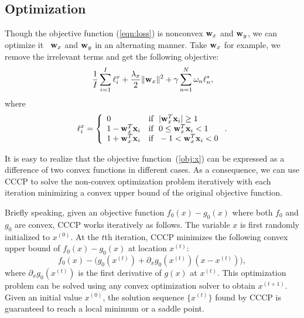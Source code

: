 \subsection{Optimization}

Though the objective function (\ref{eqn:loss}) is nonconvex \wrt ${\bf w}_{x}$ and ${\bf w}_{y}$, we can optimize it \wrt~${\bf w}_{x}$ and ${\bf w}_{y}$ in an alternating manner. Take ${\bf w}_{x}$ for example, we remove the irrelevant terms and get the following objective:
\begin{align}
\frac{1}{I}\sum\limits_{i=1}^{I}\ell_{i}^ {x}+\frac{\lambda_{x}}{2}\|{\bf w}_{x}\|^{2}+\gamma\sum\limits_{n=1}^{N}\omega_{n}\ell_{n}^{*},
\label{obj:x}
\end{align}
where
\begin{align}
\ell_{i}^{x}=\left\{ \begin{array}{ll}
         0 & \mbox{if ~}|\w_{x}^{T}\x_{i}| \ge 1 \\
         1- \w_{x}^{T}\x_{i} & \mbox{if ~}0\le\w_{x}^{T}\x_{i} < 1 \\
         1+\w_{x}^{T}\x_{i} & \mbox{if ~} -1 <\w_{x}^{T}\x_{i}<0\nonumber
                          \end{array} \right..
%
\end{align}

It is easy to realize that the objective function~(\ref{obj:x}) can be expressed as a difference of two convex functions in different cases. As a consequence, we can use \mbox{CCCP} to solve the non-convex optimization problem iteratively with each iteration minimizing a convex upper bound of the original objective function.

Briefly speaking, given an objective function $f_{0}(x)-g_{0}(x)$ where both $f_{0}$ and $g_{0}$ are convex, \mbox{CCCP} works iteratively as follows.  The variable $x$ is first randomly initialized to $x^{(0)}$.  At the $t$th iteration, \mbox{CCCP} minimizes the following convex upper bound of $f_{0}(x)-g_{0}(x)$ at location $x^{(t)}$:
$$f_{0}(x)-\big(g_{0}(x^{(t)})+\partial_{x}g_{0}(x^{(t)})(x-x^{(t)})\big),$$
where $\partial_{x}g_{0}(x^{(t)})$ is the first derivative of $g(x)$ at $x^{(t)}$. This optimization problem can be solved using any convex optimization solver to obtain $x^{(t+1)}$.  Given an initial value $x^{(0)}$, the solution sequence $\{x^{(t)}\}$ found by \mbox{CCCP} is guaranteed to reach a local minimum or a saddle point.

